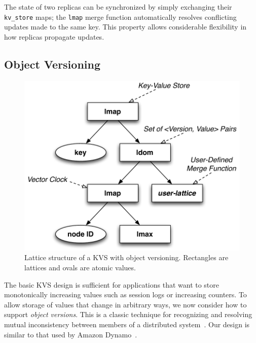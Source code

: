 The state of two replicas can be synchronized by simply exchanging their
\texttt{kv\_store} maps; the \texttt{lmap} merge function automatically resolves
conflicting updates made to the same key. This property allows considerable
flexibility in how replicas propagate updates.

\subsection{Object Versioning}
\label{sec:kvs-versions}
\begin{figure}[t]
\centering
\includegraphics[width=0.8\linewidth]{fig/kvs-vc-lattice.pdf}
\caption{Lattice structure of a KVS with object versioning. Rectangles are
  lattices and ovals are atomic values.}
\label{fig:kvs-vc-lattices}
\end{figure}

The basic KVS design is sufficient for applications that want to store
monotonically increasing values such as session logs or increasing counters. To
allow storage of values that change in arbitrary ways, we now consider how to
support \emph{object versions}. This is a classic technique for recognizing and resolving
mutual inconsistency between members of a distributed system~\cite{Parker1983}.
Our design is similar to that used by Amazon Dynamo~\cite{DeCandia2007}.

